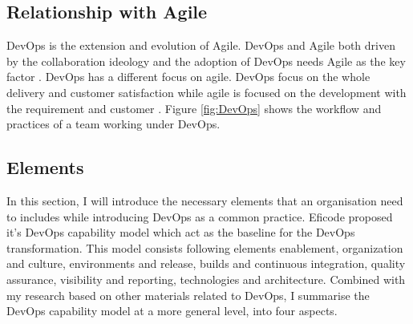 \subsection{Relationship with Agile}
DevOps is the extension and evolution \cite{lwakatare2016relationship}\cite{leite2019survey} of Agile. DevOps and Agile both driven by the collaboration ideology and the adoption of DevOps needs Agile as the key factor \cite{lwakatare2016relationship}. DevOps has a different focus on agile. DevOps focus on the whole delivery and customer satisfaction while agile is focused on the development with the requirement and customer \cite{buchanan2015agile}. Figure \ref{fig:DevOps} shows the workflow and practices of a team working under DevOps.
\subsection{Elements}
In this section, I will introduce the necessary elements that an organisation need to includes while introducing DevOps as a common practice.
Eficode proposed it's DevOps capability model which act as the baseline for the DevOps transformation. This model consists following elements enablement, organization and culture, environments and release, builds and continuous integration,  quality assurance, visibility and reporting, technologies and architecture. Combined with my research based on other materials related to DevOps, I summarise the DevOps capability model at a more general level, into four aspects.
